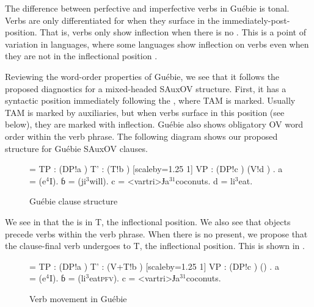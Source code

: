 \documentclass[output=paper,newtxmath,modfonts,nonflat,draftmode]{langsci/langscibook}
\begin{document}
The difference between perfective and imperfective verbs in Guébie is tonal. Verbs are only differentiated for  when they surface in the immediately-post- position. That is, verbs only show inflection when there is no . This is a point of variation in  languages, where some languages show inflection on verbs even when they are not in the inflectional position \citep{Marchese1979,Koopman:1984}.

Reviewing the word-order properties of Guébie, we see that it follows the proposed diagnostics for a mixed-headed SAuxOV structure. First, it has a syntactic  position immediately following the , where TAM is marked. Usually TAM is marked by auxiliaries, but when verbs surface in this position (see below), they are marked with inflection. Guébie also shows obligatory OV word order within the verb phrase. The following diagram shows our proposed structure for Guébie SAuxOV clauses.

\begin{figure}
\jtree[xunit=2.5em,yunit=1.25em]
\! = {TP}
: ({DP}!a ) {T'}
: ({T}!b ) [scaleby=1.25 1] {VP}
: ({DP}!c ) ({V}!d ) .
\!a = ({e$^{4}$}{I}).
ɓ = ({ji$^{3}$}{will}).
\!c = <vartri>{{Ɉ{}a}$^{31}$}{coconuts}.
\!d = {li$^{3}$}{eat}.
\endjtree
\caption{Guébie clause structure \citep[cf.][]{Sande:2017}} \label{fig:sande:Guebie}
\end{figure}

We see in  that the  is in T, the inflectional position. We also see that objects precede verbs within the verb phrase. %
When there is no  present, we propose that the clause-final verb undergoes  to T, the inflectional position. This is shown in .

\begin{figure} 
	
\jtree[xunit=2.5em,yunit=1.25em]
\! = {TP}
: ({DP}!a ) {T'}
: ({V+T}!b ) [scaleby=1.25 1] {VP}
: ({DP}!c ) ({}) .
\!a = ({e$^{4}$}{I}).
ɓ = ({li$^{3}$}{eat\textsc{pfv}}).
\!c = <vartri>{{Ɉ{}a}$^{31}$}{coconuts}.
 \hspace{12pt}
\endjtree
\vspace{6pt}
\caption{Verb movement in Guébie \citep[cf.][]{Koopman:1984, Sande:2014}} \label{fig:sande:Guebieverbmove}
\end{figure}
\end{document}
